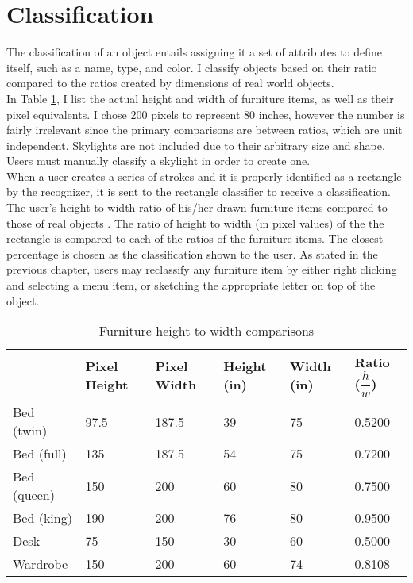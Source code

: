 \section{Classification}
\label{sec:classification}


The classification of an object entails assigning it a set of attributes to define itself, such as a name, type, and color. I classify objects based on their ratio compared to the ratios created by dimensions of real world objects. \\

In Table \ref{table:furniture}, I list the actual height and width of furniture items, as well as their pixel equivalents. I chose 200 pixels to represent 80 inches, however the number is fairly irrelevant since the primary comparisons are between ratios, which are unit independent. Skylights are not included due to their arbitrary size and shape. Users must manually classify a skylight in order to create one. \\

When a user creates a series of strokes and it is properly identified as a rectangle by the recognizer, it is sent to the rectangle classifier to receive a classification. The user's height to width ratio of his/her drawn furniture items compared to those of real objects \cite{dimensions}. The ratio of height to width (in pixel values) of the the rectangle is compared to each of the ratios of the furniture items. The closest percentage is chosen as the classification shown to the user. As stated in the previous chapter, users may reclassify any furniture item by either right clicking and selecting a menu item, or sketching the appropriate letter on top of the object. \\

\begin{table}[]
\centering
\caption{Furniture height to width comparisons}
\label{table:furniture}
\begin{tabular}{|l|l|l|l|l|l|}
\hline
 & Pixel Height & Pixel Width & {Height (in)} & {Width (in)} & Ratio ($\dfrac{h}{w}$) \\ \hline
Bed (twin) & 97.5 & 187.5 & 39 & 75 & 0.5200 \\ \hline
Bed (full) & 135 & 187.5 & 54 & 75 & 0.7200 \\ \hline
Bed (queen) & 150 & 200 & 60 & 80 & 0.7500 \\ \hline
Bed (king) & 190 & 200 & 76 & 80 & 0.9500 \\ \hline
Desk & 75 & 150 & 30 & 60 & 0.5000 \\ \hline
Wardrobe & 150 & 200 & 60 & 74 & 0.8108 \\ \hline
\end{tabular}
\end{table}

